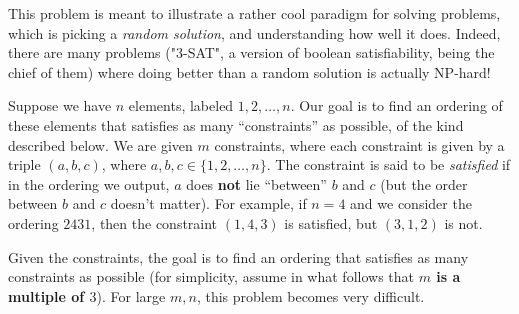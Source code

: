 \documentclass[addpoints, 11pt]{exam}
\begin{document}
\begin{questions}
  This problem is meant to illustrate a rather cool paradigm for solving problems, which is picking a {\em random solution}, and understanding how well it does. Indeed, there are many problems ("3-SAT", a version of boolean satisfiability, being the chief of them) where doing better than a random solution is actually NP-hard!

  Suppose we have $n$ elements, labeled $1, 2, \dots, n$. Our goal is to find an ordering of these elements that satisfies as many ``constraints'' as possible, of the kind described below. We are given $m$ constraints, where each constraint is given by a triple $(a, b, c)$, where $a, b, c \in \{1, 2, \dots, n\}$. The constraint is said to be {\em satisfied} if in the ordering we output, $a$ does {\bf not} lie ``between'' $b$ and $c$ (but the order between $b$ and $c$ doesn't matter).  For example, if $n=4$ and we consider the ordering $2 4 3 1$, then the constraint $(1, 4, 3)$ is satisfied, but $(3, 1, 2)$ is not.

  Given the constraints, the goal is to find an ordering that satisfies as many constraints as possible (for simplicity, assume in what follows that {\bf $m$ is a multiple of $3$}). For large $m, n$, this problem becomes very difficult.

\end{questions}
\end{document}

